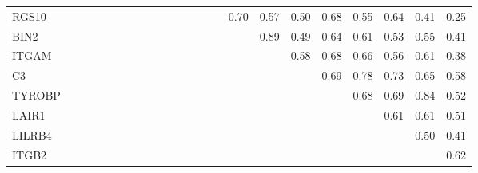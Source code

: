 \begin{longtable}{lrrrrrrrrrrrrrrrrrrrrrr}
RGS10   &            &            &              &              &             &            &            &            &              &              &             &           &               &             &       0.70 &        0.57 &     0.50 &         0.68 &        0.55 &         0.64 &        0.41 &        0.25 \\
BIN2    &            &            &              &              &             &            &            &            &              &              &             &           &               &             &            &        0.89 &     0.49 &         0.64 &        0.61 &         0.53 &        0.55 &        0.41 \\
ITGAM   &            &            &              &              &             &            &            &            &              &              &             &           &               &             &            &             &     0.58 &         0.68 &        0.66 &         0.56 &        0.61 &        0.38 \\
C3      &            &            &              &              &             &            &            &            &              &              &             &           &               &             &            &             &          &         0.69 &        0.78 &         0.73 &        0.65 &        0.58 \\
TYROBP  &            &            &              &              &             &            &            &            &              &              &             &           &               &             &            &             &          &              &        0.68 &         0.69 &        0.84 &        0.52 \\
LAIR1   &            &            &              &              &             &            &            &            &              &              &             &           &               &             &            &             &          &              &             &         0.61 &        0.61 &        0.51 \\
LILRB4  &            &            &              &              &             &            &            &            &              &              &             &           &               &             &            &             &          &              &             &              &        0.50 &        0.41 \\
ITGB2   &            &            &              &              &             &            &            &            &              &              &             &           &               &             &            &             &          &              &             &              &             &        0.62 \\
\end{longtable}


